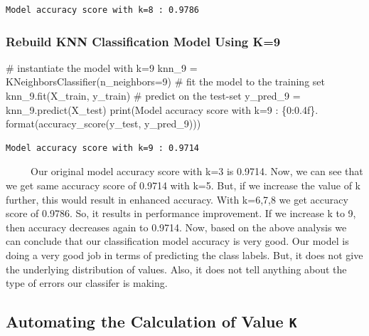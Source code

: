 \documentclass[
  letterpaper,
  DIV=11,
  numbers=noendperiod]{scrreprt}
\newenvironment{Shaded}{\begin{snugshade}}{\end{snugshade}}
\newcommand{\BuiltInTok}[1]{\textcolor[rgb]{0.00,0.23,0.31}{#1}}
\newcommand{\CommentTok}[1]{\textcolor[rgb]{0.37,0.37,0.37}{#1}}
\newcommand{\DecValTok}[1]{\textcolor[rgb]{0.68,0.00,0.00}{#1}}
\newcommand{\NormalTok}[1]{\textcolor[rgb]{0.00,0.23,0.31}{#1}}
\newcommand{\OperatorTok}[1]{\textcolor[rgb]{0.37,0.37,0.37}{#1}}
\newcommand{\SpecialCharTok}[1]{\textcolor[rgb]{0.37,0.37,0.37}{#1}}
\newcommand{\StringTok}[1]{\textcolor[rgb]{0.13,0.47,0.30}{#1}}
\begin{document}
\begin{verbatim}
Model accuracy score with k=8 : 0.9786
\end{verbatim}

\subsubsection{Rebuild KNN Classification Model Using
K=9}\label{rebuild-knn-classification-model-using-k9}

\begin{Shaded}
\begin{Highlighting}[]
\CommentTok{\# instantiate the model with k=9}
\NormalTok{knn\_9 }\OperatorTok{=}\NormalTok{ KNeighborsClassifier(n\_neighbors}\OperatorTok{=}\DecValTok{9}\NormalTok{)}
\CommentTok{\# fit the model to the training set}
\NormalTok{knn\_9.fit(X\_train, y\_train)}
\CommentTok{\# predict on the test{-}set}
\NormalTok{y\_pred\_9 }\OperatorTok{=}\NormalTok{ knn\_9.predict(X\_test)}
\BuiltInTok{print}\NormalTok{(}\StringTok{\textquotesingle{}Model accuracy score with k=9 : }\SpecialCharTok{\{0:0.4f\}}\StringTok{\textquotesingle{}}\NormalTok{. }\BuiltInTok{format}\NormalTok{(accuracy\_score(y\_test, y\_pred\_9)))}
\end{Highlighting}
\end{Shaded}

\begin{verbatim}
Model accuracy score with k=9 : 0.9714
\end{verbatim}

~~~~~Our original model accuracy score with k=3 is 0.9714. Now, we can
see that we get same accuracy score of 0.9714 with k=5. But, if we
increase the value of k further, this would result in enhanced accuracy.
With k=6,7,8 we get accuracy score of 0.9786. So, it results in
performance improvement. If we increase k to 9, then accuracy decreases
again to 0.9714. Now, based on the above analysis we can conclude that
our classification model accuracy is very good. Our model is doing a
very good job in terms of predicting the class labels. But, it does not
give the underlying distribution of values. Also, it does not tell
anything about the type of errors our classifer is making.

\subsection{\texorpdfstring{Automating the Calculation of Value
\texttt{K}}{Automating the Calculation of Value K}}\label{automating-the-calculation-of-value-k}
\end{document}
